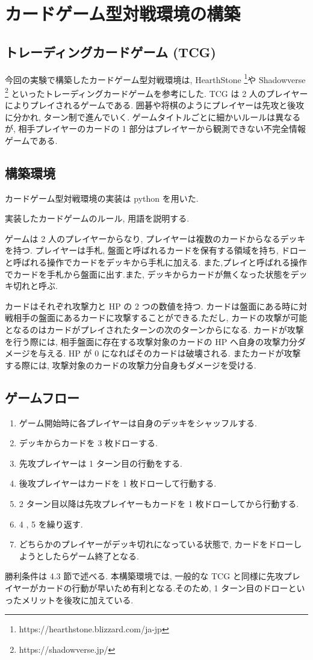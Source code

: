 \documentclass[twocolumn]{jarticle}     %
\begin{document}
\section{カードゲーム型対戦環境の構築}
\subsection{トレーディングカードゲーム (TCG)}
今回の実験で構築したカードゲーム型対戦環境は, HearthStone \footnote[1]{https://hearthstone.blizzard.com/ja-jp}や Shadowverse \footnote[2]{https://shadowverse.jp/} といったトレーディングカードゲームを参考にした. TCG は 2 人のプレイヤーによりプレイされるゲームである. 囲碁や将棋のようにプレイヤーは先攻と後攻に分かれ, ターン制で進んでいく. 
ゲームタイトルごとに細かいルールは異なるが, 相手プレイヤーのカードの 1 部分はプレイヤーから観測できない不完全情報ゲームである.

\subsection{構築環境}
カードゲーム型対戦環境の実装は python を用いた.\par
実装したカードゲームのルール, 用語を説明する.\par
ゲームは 2 人のプレイヤーからなり, プレイヤーは複数のカードからなるデッキを持つ.
プレイヤーは手札, 盤面と呼ばれるカードを保有する領域を持ち, ドローと呼ばれる操作でカードをデッキから手札に加える. また,プレイと呼ばれる操作でカードを手札から盤面に出す.また, デッキからカードが無くなった状態をデッキ切れと呼ぶ.
\par
カードはそれぞれ攻撃力と HP の 2 つの数値を持つ. カードは盤面にある時に対戦相手の盤面にあるカードに攻撃することができる.ただし, カードの攻撃が可能となるのはカードがプレイされたターンの次のターンからになる. カードが攻撃を行う際には, 相手盤面に存在する攻撃対象のカードの HP へ自身の攻撃力分ダメージを与える. HP が 0 になればそのカードは破壊される. またカードが攻撃する際には, 攻撃対象のカードの攻撃力分自身もダメージを受ける.

\subsection{ゲームフロー}
\begin{enumerate}
  \setlength{\itemsep}{0cm} %
  \item ゲーム開始時に各プレイヤーは自身のデッキをシャッフルする.
  \item デッキからカードを 3 枚ドローする.
  \item 先攻プレイヤーは 1 ターン目の行動をする.
  \item 後攻プレイヤーはカードを 1 枚ドローして行動する.
  \item 2 ターン目以降は先攻プレイヤーもカードを 1 枚ドローしてから行動する.
  \item 4 , 5 を繰り返す.
  \item どちらかのプレイヤーがデッキ切れになっている状態で, カードをドローしようとしたらゲーム終了となる.
\end{enumerate}
勝利条件は 4.3 節で述べる.
本構築環境では, 一般的な TCG と同様に先攻プレイヤーがカードの行動が早いため有利となる.そのため, 1 ターン目のドローといったメリットを後攻に加えている. 
\end{document}
